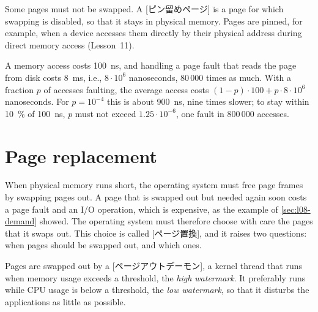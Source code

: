 \documentclass[../main.tex]{subfiles}
\begin{document}
Some pages must not be swapped.  A [ピン留めページ] is a
page for which swapping is disabled, so that it stays in physical memory.
Pages are pinned, for example, when a device accesses them directly by
their physical address during direct memory access (Lesson~11).

\begin{example}
  A memory access costs \SI{100}{\nano\second}, and handling a page fault
  that reads the page from disk costs \SI{8}{\milli\second}, i.e.,
  $8 \cdot 10^{6}$ nanoseconds, 80\,000 times as much.  With a fraction $p$
  of accesses faulting, the average access costs $(1-p) \cdot 100 + p \cdot 8 \cdot 10^{6}$
  nanoseconds.  For $p = 10^{-4}$ this is about \SI{900}{\nano\second}, nine
  times slower; to stay within \SI{10}{\percent} of \SI{100}{\nano\second},
  $p$ must not exceed $1.25 \cdot 10^{-6}$, one fault in 800\,000 accesses.
\end{example}

\section{Page replacement}
\label{sec:l08-replacement}

When physical memory runs short, the operating system must free page frames
by swapping pages out.  A page that
is swapped out but needed again soon costs a page fault and an I/O
operation, which is expensive, as the example of \cref{sec:l08-demand}
showed.  The operating system must therefore choose with care the pages
that it swaps out.  This choice is called [ページ置換], and it raises two questions: when pages should be
swapped out, and which ones.

Pages are swapped out by a [ページアウトデーモン], a
kernel thread that runs when memory usage exceeds a threshold, the
\emph{high watermark}.  It preferably runs while CPU usage is below a
threshold, the \emph{low watermark}, so that it disturbs the applications
as little as possible.
\end{document}
